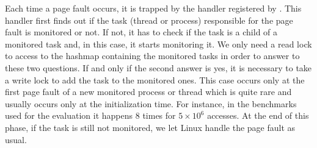 

Each time a page fault occurs, it is trapped by the handler registered by \Moca.
This handler first finds out if the task
(thread or process) responsible for the page fault is
monitored or not. If not, it has to check if the task is a child of a monitored
task and, in this case, it starts monitoring it. We only need a read lock
to access to the hashmap containing the monitored tasks in order to answer to these
two questions.
If and only if the second answer is yes, it is necessary to take
a write lock to add the task to the monitored ones.
This case occurs only at the first page fault of a new monitored
process or thread which is quite rare and usually occurs only at the
initialization time. For instance, in the benchmarks used for
the evaluation it happens $8$ times for $5\times10^6$ accesses.
At the end of this phase, if the task is still not monitored, we let Linux handle the page fault as usual.

